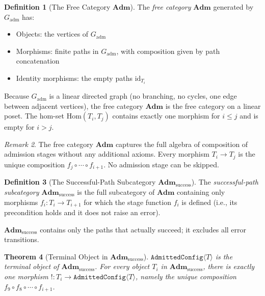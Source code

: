 \documentclass[12pt, letterpaper]{report}
\theoremstyle{plain}
\newtheorem{theorem}{Theorem}[chapter]
\theoremstyle{definition}
\newtheorem{definition}[theorem]{Definition}
\theoremstyle{remark}
\newtheorem{remark}[theorem]{Remark}
\begin{document}
\begin{definition}[The Free Category $\mathbf{Adm}$]
\label{def:adm}
The \emph{free category} $\mathbf{Adm}$ generated by $G_{\mathrm{adm}}$ has:
\begin{itemize}
  \item Objects: the vertices of $G_{\mathrm{adm}}$
  \item Morphisms: finite paths in $G_{\mathrm{adm}}$,
        with composition given by path concatenation
  \item Identity morphisms: the empty paths $\mathrm{id}_{T_i}$
\end{itemize}
Because $G_{\mathrm{adm}}$ is a linear directed graph (no branching,
no cycles, one edge between adjacent vertices), the free category
$\mathbf{Adm}$ is the free category on a linear poset.
The hom-set $\mathrm{Hom}(T_i, T_j)$ contains exactly one morphism
for $i \leq j$ and is empty for $i > j$.
\end{definition}

\begin{remark}
The free category $\mathbf{Adm}$ captures the full algebra of composition
of admission stages without any additional axioms. Every morphism
$T_i \to T_j$ is the unique composition $f_j \circ \cdots \circ f_{i+1}$.
No admission stage can be skipped.
\end{remark}

\begin{definition}[The Successful-Path Subcategory $\mathbf{Adm}_{\mathrm{success}}$]
\label{def:adm-success}
The \emph{successful-path subcategory} $\mathbf{Adm}_{\mathrm{success}}$
is the full subcategory of $\mathbf{Adm}$ containing only morphisms
$f_i : T_i \to T_{i+1}$ for which the stage function $f_i$
is defined (i.e., its precondition holds and it does not raise an error).

$\mathbf{Adm}_{\mathrm{success}}$ contains only the paths that actually
succeed; it excludes all error transitions.
\end{definition}

\begin{theorem}[Terminal Object in $\mathbf{Adm}_{\mathrm{success}}$]
\label{thm:terminal}
$\texttt{AdmittedConfig}\langle T\rangle$ is the terminal object of
$\mathbf{Adm}_{\mathrm{success}}$.
For every object $T_i$ in $\mathbf{Adm}_{\mathrm{success}}$,
there is exactly one morphism $! : T_i \to \texttt{AdmittedConfig}\langle T\rangle$,
namely the unique composition
$f_9 \circ f_8 \circ \cdots \circ f_{i+1}$.
\end{theorem}
\end{document}
